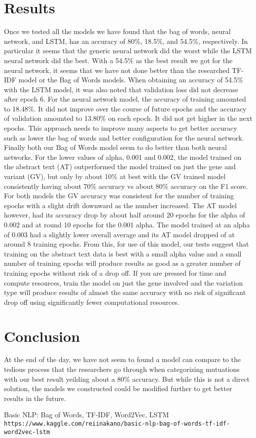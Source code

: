 \documentclass{article}
\begin{document}
    \section{Results}
    Once we tested all the models we have found that the bag of words, neural network, and LSTM, has an accuracy of 80\%, 18.5\%, and 54.5\%, respectively.  In particular it seems that the generic neural network did the worst while the LSTM neural network did the best.  With a 54.5\% as the best result we got for the neural network, it seems that we have not done better than the researched TF-IDF model or the Bag of Words models.  When obtaining an accuracy of 54.5\% with the LSTM model, it was also noted that validation loss did not decrease after epoch 6. For the neural network model, the accuracy of training amounted to 18.48\%. It did not improve over the course of future epochs and the accuracy of validation amounted to 13.80\% on each epoch. It did not get higher in the next epochs.  This approach needs to improve many aspects to get better accuracy such as lower the bag of words and better configuration for the neural network.  Finally both our Bag of Words model seem to do better than both neural networks.  For the lower values of alpha, 0.001 and 0.002, the model trained on the abstract text (AT) outperformed the model trained on just the gene and variant (GV), but only by about 10\% at best with the GV trained model consistently having about 70\% accuracy vs about 80\% accuracy on the F1 score. For both models the GV accuracy was consistent for the number of training epochs with a slight drift downward as the number increased. The AT model however, had its accuracy drop by about half around 20 epochs for the alpha of 0.002 and at round 10 epochs for the 0.001 alpha. The model trained at an alpha of 0.003 had a slightly lower overall average and its AT model dropped of at around 8 training epochs. From this, for use of this model, our tests suggest that training on the abstract text data is best with a small alpha value and a small number of training epochs will produce results as good as a greater number of training epochs without risk of a drop off. If you are pressed for time and compute resources, train the model on just the gene involved and the variation type will produce results of almost the same accuracy with no risk of significant drop off using significantly fewer computational resources. 


    
    \section{Conclusion}
    At the end of the day, we have not seem to found a model can compare to the tedious process that the researchers go through when categorizing mutuations with our best result yeilding about a 80\% accuracy.  But while this is not a direct solution, the models we constructed could be modified further to get better results in the future.    
    
    \pagebreak
    \begin{thebibliography}{9}
        Basic NLP: Bag of Words, TF-IDF, Word2Vec, LSTM
        \\\texttt{https://www.kaggle.com/reiinakano/basic-nlp-bag-of-words-tf-idf-word2vec-lstm}
      
         
    \end{thebibliography}
    
    
\end{document}
